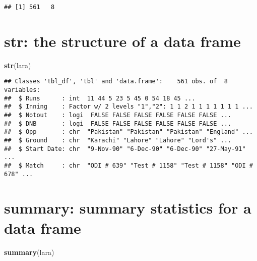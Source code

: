 \documentclass[]{book}
\newenvironment{Shaded}{\begin{snugshade}}{\end{snugshade}}
\newcommand{\KeywordTok}[1]{\textcolor[rgb]{0.13,0.29,0.53}{\textbf{#1}}}
\newcommand{\NormalTok}[1]{#1}
\begin{document}
\begin{verbatim}
## [1] 561   8
\end{verbatim}

\hypertarget{str}{%
\section*{\texorpdfstring{\textbf{str}: the structure of a data frame}{str: the structure of a data frame}}\label{str}}

\begin{Shaded}
\begin{Highlighting}[]
\KeywordTok{str}\NormalTok{(lara)}
\end{Highlighting}
\end{Shaded}

\begin{verbatim}
## Classes 'tbl_df', 'tbl' and 'data.frame':    561 obs. of  8 variables:
##  $ Runs      : int  11 44 5 23 5 45 0 54 18 45 ...
##  $ Inning    : Factor w/ 2 levels "1","2": 1 1 2 1 1 1 1 1 1 1 ...
##  $ Notout    : logi  FALSE FALSE FALSE FALSE FALSE FALSE ...
##  $ DNB       : logi  FALSE FALSE FALSE FALSE FALSE FALSE ...
##  $ Opp       : chr  "Pakistan" "Pakistan" "Pakistan" "England" ...
##  $ Ground    : chr  "Karachi" "Lahore" "Lahore" "Lord's" ...
##  $ Start Date: chr  "9-Nov-90" "6-Dec-90" "6-Dec-90" "27-May-91" ...
##  $ Match     : chr  "ODI # 639" "Test # 1158" "Test # 1158" "ODI # 678" ...
\end{verbatim}

\hypertarget{summary}{%
\section*{\texorpdfstring{\textbf{summary}: summary statistics for a data frame}{summary: summary statistics for a data frame}}\label{summary}}

\begin{Shaded}
\begin{Highlighting}[]
\KeywordTok{summary}\NormalTok{(lara)}
\end{Highlighting}
\end{Shaded}
\end{document}
